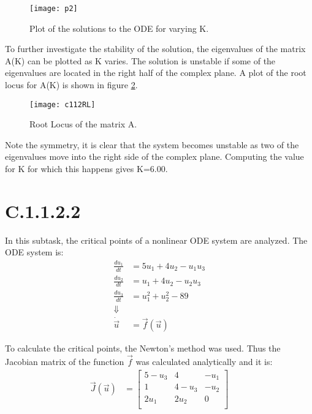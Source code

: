\documentclass[11pt,a4paper,roman]{scrartcl}
\begin{document}
\begin{figure}[h]
\centering
\texttt{[image: p2]}
\caption{Plot of the solutions to the ODE for varying K.}
\label{solplot2}
\end{figure}

To further investigate the stability of the solution, the eigenvalues of the matrix A(K) can be plotted as K varies. The solution is unstable if some of the eigenvalues are located in the right half of the complex plane. A plot of the root locus for A(K) is shown in figure \ref*{rootlocus}.

\begin{figure}[h]
\centering
\texttt{[image: c112RL]}
\caption{Root Locus of the matrix A.}
\label{rootlocus}
\end{figure}

Note the symmetry, it is clear that the system becomes unstable as two of the eigenvalues move into the right side of the complex plane. Computing the value for K for which this happens gives K=6.00. 

\section*{C.1.1.2.2}
In this subtask, the critical points of a nonlinear ODE system are analyzed. The ODE system is:
\begin{equation}
\begin{aligned}
\frac{du_1}{dt} & = 5u_1 + 4u_2 - u_1u_3 \\
\frac{du_2}{dt} & = u_1 + 4u_2 - u_2u_3 \\
\frac{du_3}{dt} & = u_1^2 + u_2^2 - 89 \\
\Downarrow \\
\dot{\vec{u}} & = \vec{f}(\vec{u})
\end{aligned}
\end{equation}

To calculate the critical points, the Newton's method was used. Thus the Jacobian matrix of the function $\vec{f}$ was calculated analytically and it is: 
\begin{equation}
\begin{aligned}
\vec{J}(\vec{u}) & = 
\begin{bmatrix}
5-u_3 & 4 & -u_1 \\
1 & 4-u_3 & -u_2 \\
2u_1 & 2u_2 & 0 \\
\end{bmatrix}
\end{aligned}
\end{equation}
\end{document}
